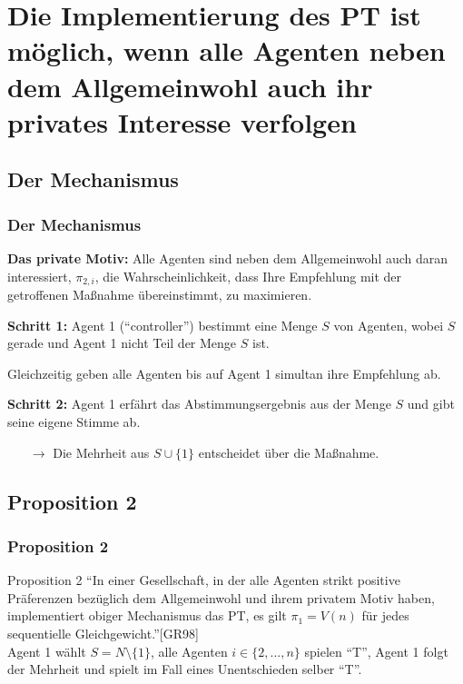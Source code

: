 \documentclass{beamer}
\begin{document}
\section[Das PT und das private Motiv]{Die Implementierung des PT ist m\"oglich, wenn alle Agenten neben dem Allgemeinwohl auch ihr privates Interesse verfolgen}
\subsection{Der Mechanismus}
\begin{frame}\frametitle{Der Mechanismus}
\textbf{Das private Motiv:} Alle Agenten sind neben dem Allgemeinwohl auch daran interessiert, $\pi_{2,i}$, die Wahrscheinlichkeit, dass Ihre Empfehlung mit der getroffenen Ma{\ss}nahme \"ubereinstimmt, zu maximieren.
\vspace{0.5cm}

\textbf{Schritt 1:} Agent 1 (``controller'') bestimmt eine Menge $S$ von Agenten, wobei $S$ gerade und Agent 1 nicht Teil der Menge $S$ ist.

Gleichzeitig geben alle Agenten bis auf Agent 1 simultan ihre Empfehlung ab.

\textbf{Schritt 2:} Agent 1 erf\"ahrt das Abstimmungsergebnis aus der Menge $S$ und gibt seine eigene Stimme ab.
\begin{itemize}
\item[$\rightarrow$]Die Mehrheit aus $S \cup \{1\} $ entscheidet \"uber die Ma{\ss}nahme.
\end{itemize}
\end{frame}




\subsection{Proposition 2}
\begin{frame}\frametitle{Proposition 2}
\begin{block}{Proposition 2}
``In einer Gesellschaft, in der alle Agenten strikt positive Pr\"aferenzen bez\"uglich dem Allgemeinwohl und ihrem privatem Motiv haben, implementiert obiger Mechanismus das PT, es gilt $\pi_1=V(n)$ f\"ur jedes sequentielle Gleichgewicht.''[GR98]\\
Agent 1 w\"ahlt $S=N \setminus \{1\}$, alle Agenten $i\in \{2,...,n\}$ spielen ``T'', Agent 1 folgt der Mehrheit und spielt im Fall eines Unentschieden selber ``T''.
\end{block}
\end{frame}
\end{document}
